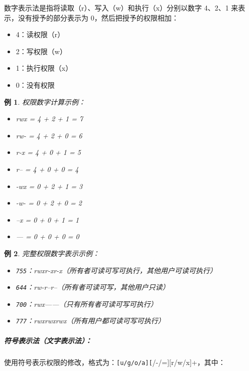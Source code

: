 \documentclass[12pt,UTF8]{ctexbook}
\newtheorem{example}{例}[chapter]
\begin{document}
数字表示法是指将读取（r）、写入（w）和执行（x）分别以数字 4、2、1 来表示，没有授予的部分表示为 0，然后把授予的权限相加：
\begin{itemize}
    \item 4：读权限（r）
    \item 2：写权限（w）
    \item 1：执行权限（x）
    \item 0：没有权限
\end{itemize}

\begin{example}
权限数字计算示例：
\begin{itemize}
    \item rwx = 4 + 2 + 1 = 7
    \item rw- = 4 + 2 + 0 = 6
    \item r-x = 4 + 0 + 1 = 5
    \item r-- = 4 + 0 + 0 = 4
    \item -wx = 0 + 2 + 1 = 3
    \item -w- = 0 + 2 + 0 = 2
    \item --x = 0 + 0 + 1 = 1
    \item --- = 0 + 0 + 0 = 0
\end{itemize}
\end{example}

\begin{example}
完整权限数字表示示例：
\begin{itemize}
    \item \verb+755+：rwxr-xr-x（所有者可读可写可执行，其他用户可读可执行）
    \item \verb+644+：rw-r--r--（所有者可读可写，其他用户只读）
    \item \verb+700+：rwx------（只有所有者可读可写可执行）
    \item \verb+777+：rwxrwxrwx（所有用户都可读可写可执行）
\end{itemize}
\end{example}

\subparagraph{符号表示法（文字表示法）：}
使用符号表示权限的修改，格式为：\verb+[u/g/o/a][+/-/=][r/w/x]+，其中：
\end{document}
